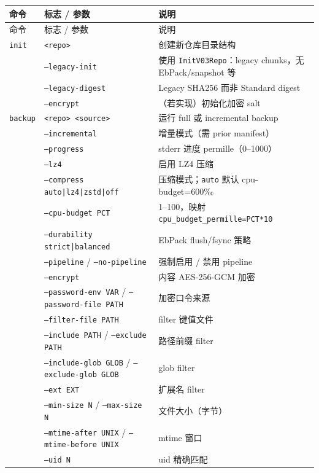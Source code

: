 \begin{longtable}{@{}p{2.2cm}p{4.8cm}p{7.2cm}@{}}
\toprule
命令 & 标志 / 参数 & 说明 \\
\midrule
\endfirsthead
\toprule
命令 & 标志 / 参数 & 说明 \\
\midrule
\endhead

\texttt{init} &
\texttt{<repo>} &
创建新仓库目录结构 \\
&
\texttt{--legacy-init} &
使用 \texttt{InitV03Repo}：legacy chunks，无 EbPack/snapshot 等 \\
&
\texttt{--legacy-digest} &
Legacy SHA256 而非 Standard digest \\
&
\texttt{--encrypt} &
（若实现）初始化加密 salt \\
\midrule

\texttt{backup} &
\texttt{<repo> <source>} &
运行 full 或 incremental backup \\
&
\texttt{--incremental} &
增量模式（需 prior manifest） \\
&
\texttt{--progress} &
stderr 进度 permille（0--1000） \\
&
\texttt{--lz4} &
启用 LZ4 压缩 \\
&
\texttt{--compress auto|lz4|zstd|off} &
压缩模式；\texttt{auto} 默认 cpu-budget=600‰ \\
&
\texttt{--cpu-budget PCT} &
1--100，映射 \texttt{cpu\_budget\_permille=PCT*10} \\
&
\texttt{--durability strict|balanced} &
EbPack flush/fsync 策略 \\
&
\texttt{--pipeline} / \texttt{--no-pipeline} &
强制启用 / 禁用 pipeline \\
&
\texttt{--encrypt} &
内容 AES-256-GCM 加密 \\
&
\texttt{--password-env VAR} / \texttt{--password-file PATH} &
加密口令来源 \\
&
\texttt{--filter-file PATH} &
filter 键值文件 \\
&
\texttt{--include PATH} / \texttt{--exclude PATH} &
路径前缀 filter \\
&
\texttt{--include-glob GLOB} / \texttt{--exclude-glob GLOB} &
glob filter \\
&
\texttt{--ext EXT} &
扩展名 filter \\
&
\texttt{--min-size N} / \texttt{--max-size N} &
文件大小（字节） \\
&
\texttt{--mtime-after UNIX} / \texttt{--mtime-before UNIX} &
mtime 窗口 \\
&
\texttt{--uid N} &
uid 精确匹配 \\
\midrule


\end{longtable}
